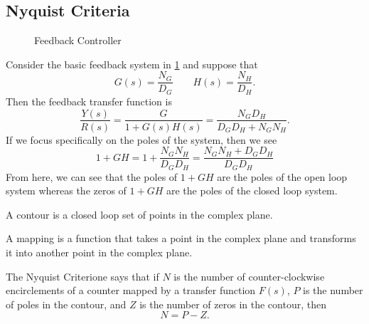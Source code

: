 \subsection{Nyquist Criteria}
\begin{figure}[H]
    \centering 
    \caption{Feedback Controller}
    \label{fig:nyquist-feedback-controller}
\end{figure}
Consider the basic feedback system in \cref{fig:nyquist-feedback-controller} and suppose that
\[
  G(s) = \frac{N_G}{D_G} \qquad H(s) = \frac{N_H}{D_H}.
\]
Then the feedback transfer function is
\[
  \frac{Y(s)}{R(s)} = \frac{G}{1+G(s)H(s)} = \frac{N_GD_H}{D_GD_H + N_GN_H}.
\]
If we focus specifically on the poles of the system, then we see
\[
  1+GH = 1 + \frac{N_GN_H}{D_GD_H} = \frac{N_GN_H+D_GD_H}{D_GD_H}
\]
From here, we can see that the poles of $1+GH$ are the poles of the open loop system whereas the zeros of $1+GH$ are the poles of the closed loop system.
\begin{definition}
  A contour is a closed loop set of points in the complex plane.
  \label{defn:contour}
\end{definition}
\begin{definition}
  A mapping is a function that takes a point in the complex plane and transforms it into another point in the complex plane.
  \label{defn:mapping}
\end{definition}
\begin{definition}
  The Nyquist Criterione says that if $N$ is the number of counter-clockwise encirclements of a counter mapped by a transfer function $F(s)$, $P$ is the number of poles in the contour, and $Z$ is the number of zeros in the contour, then
  \begin{equation}
	N = P - Z.
	\label{eqn:nyquist-criteria}
  \end{equation}
  \label{defn:nyquist-criteria}
\end{definition}
